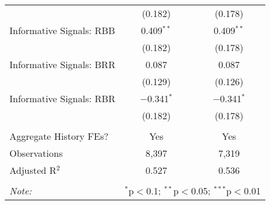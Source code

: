\begin{table}[!htbp]
\begin{tabular}{@{\extracolsep{5pt}}lcc}
  & (0.182) & (0.178) \\ 
  Informative Signals: RBB & 0.409$^{**}$ & 0.409$^{**}$ \\ 
  & (0.182) & (0.178) \\ 
  Informative Signals: BRR & 0.087 & 0.087 \\ 
  & (0.129) & (0.126) \\ 
  Informative Signals: RBR & $-$0.341$^{*}$ & $-$0.341$^{*}$ \\ 
  & (0.182) & (0.178) \\ 
 \hline \\[-1.8ex] 
Aggregate History FEs? & Yes & Yes \\ 
Observations & 8,397 & 7,319 \\ 
Adjusted R$^{2}$ & 0.527 & 0.536 \\ 
\hline 
\hline \\[-1.8ex] 
\textit{Note:}  & \multicolumn{2}{r}{$^{*}$p$<$0.1; $^{**}$p$<$0.05; $^{***}$p$<$0.01} \\ 
\end{tabular} 
\end{table} 

